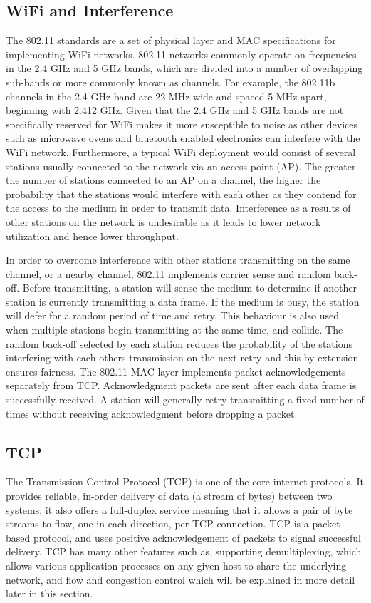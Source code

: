 \subsection{WiFi and Interference}
The 802.11 standards are a set of physical layer and MAC specifications for
implementing WiFi networks.  802.11 networks commonly operate on frequencies in
the 2.4 GHz and 5 GHz bands, which are divided into a number of overlapping
sub-bands or more commonly known as channels. For example, the 802.11b channels 
in the 2.4 GHz band are 22 MHz wide and spaced 5 MHz apart, beginning with 2.412 
GHz. Given that the 2.4 GHz and 5 GHz bands are not specifically reserved for 
WiFi makes it more susceptible to noise as other devices such as microwave ovens 
and bluetooth enabled electronics can interfere with the WiFi network. 
Furthermore, a typical WiFi deployment would consist of several stations usually 
connected to the network via an access point (AP). The greater the number of 
stations connected to an AP on a channel, the higher the probability that the 
stations would interfere with each other as they contend for the access to the 
medium in order to transmit data. Interference as a results of other stations on 
the network is undesirable as it leads to lower network utilization and hence 
lower throughput.

In order to overcome interference with other stations transmitting on the same
channel, or a nearby channel, 802.11 implements carrier sense and random 
back-off. Before transmitting, a station will sense the medium to determine if
another station is currently transmitting a data frame. If the medium is busy,
the station will defer for a random period of time and retry. This behaviour is
also used when multiple stations begin transmitting at the same time, and
collide. The random back-off selected by each station reduces the probability 
of the stations interfering with each others transmission on the next retry and 
this by extension ensures fairness.
The 802.11 MAC layer implements packet acknowledgements separately from
TCP. Acknowledgment packets are sent after each data frame is successfully 
received. A station will generally retry transmitting a fixed number of times 
without receiving acknowledgment before dropping a packet.

\subsection{TCP}
The Transmission Control Protocol (TCP) is one of the core internet protocols. 
It provides reliable, in-order delivery of data (a stream of bytes) between two 
systems, it also offers a full-duplex service meaning that it allows a pair of 
byte streams to flow, one in each direction, per TCP connection. TCP is a 
packet-based protocol, and uses positive acknowledgement of packets to signal 
successful delivery. TCP has many other features such as, supporting 
demultiplexing, which allows various application processes on any given host to 
share the underlying network, and flow and congestion control which will be 
explained in more detail later in this section.


